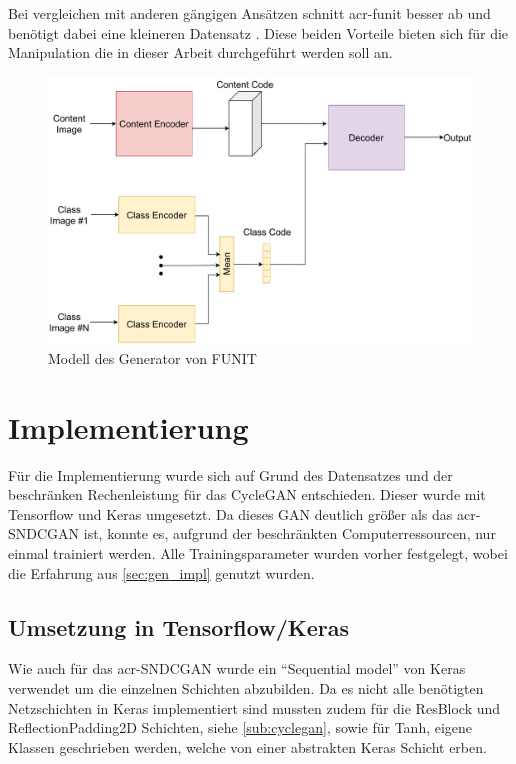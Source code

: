  Bei vergleichen mit anderen gängigen Ansätzen schnitt  \gls{acr-funit}  besser ab und benötigt dabei eine kleineren Datensatz \cite{liu_few-shot_2019}. Diese beiden Vorteile bieten sich für die Manipulation die in dieser Arbeit durchgeführt werden soll an.
 
 \begin{figure}[h]
 	\centering
 	\includegraphics[width=0.8\linewidth]{images/Funit_Model_simple}
 	\caption[Modell FUNIT]{Modell des Generator von FUNIT}
 	\label{fig:funitmodelsimple}
 \end{figure}
 

 
 \section{Implementierung} %
  Für die Implementierung wurde sich auf Grund des Datensatzes und der beschränken Rechenleistung für das CycleGAN entschieden. Dieser wurde mit Tensorflow und Keras umgesetzt. Da dieses GAN deutlich größer als das \gls{acr-SNDCGAN} ist, konnte es, aufgrund der beschränkten Computerressourcen, nur einmal trainiert werden. Alle Trainingsparameter wurden vorher festgelegt, wobei die Erfahrung aus \cref{sec:gen_impl} genutzt wurden.
 
 \subsection{Umsetzung in Tensorflow/Keras}
 Wie auch für das \gls{acr-SNDCGAN} wurde ein \enquote{Sequential model} von Keras~\cite{keras:SequentialModel} verwendet um die einzelnen Schichten abzubilden. Da es nicht alle benötigten Netzschichten in Keras  implementiert sind mussten zudem für die ResBlock und ReflectionPadding2D Schichten, siehe \cref{sub:cyclegan}, sowie für Tanh,  eigene Klassen geschrieben werden, welche von einer abstrakten Keras Schicht erben. 
 
